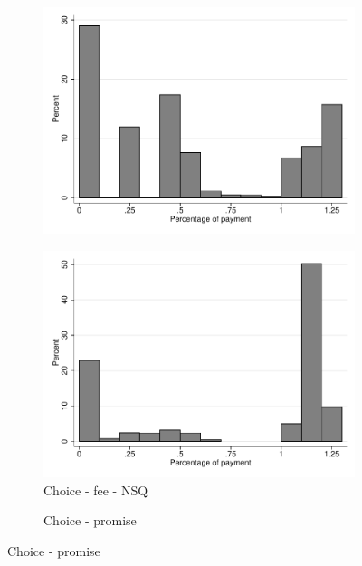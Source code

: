 \documentclass[11pt]{article}
\begin{document}
\begin{figure}[H]
\begin{center}
\begin{subfigure}{.31\textwidth}
        \includegraphics[width=\textwidth]{Figuras/hist_porc_pay_pro_6.pdf}
    \end{subfigure}    
     \begin{subfigure}{.31\textwidth}
    \caption{Choice - fee - NSQ}
        \centering
        \includegraphics[width=\textwidth]{Figuras/hist_porc_pay_pro_7.pdf}
    \end{subfigure}    
     \begin{subfigure}{.31\textwidth}
    \caption{Choice - promise}
        \centering

\end{subfigure}
\end{center}
\end{figure}
\end{document}
